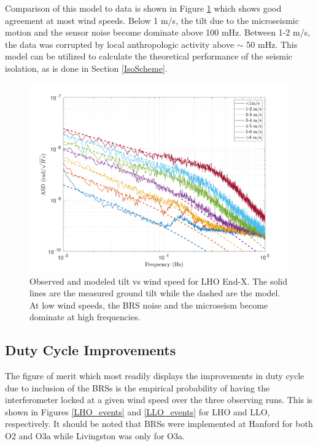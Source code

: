 \documentclass [12pt, proquest]{uwthesis}[2019]
\begin{document}
Comparison of this model to data is shown in Figure \ref{tiltModel} which shows good agreement at most wind speeds. Below 1 m/s, the tilt due to the microseismic motion and the sensor noise become dominate above 100 mHz. Between 1-2 m/s, the data was corrupted by local anthropologic activity above $\sim$ 50 mHz. This model can be utilized to calculate the theoretical performance of the seismic isolation, as is done in Section \ref{IsoScheme}.

\begin{figure}[!h]
\begin{center}
\includegraphics[width=\textwidth]{TiltModel.pdf}
\caption[Observed and modeled tilt vs wind speed]{Observed and modeled tilt vs wind speed for LHO End-X. The solid lines are the measured ground tilt while the dashed are the model. At low wind speeds, the BRS noise and the microseism become dominate at high frequencies.}
\label{tiltModel}
\end{center}
\end{figure}

\subsection{Duty Cycle Improvements}

The figure of merit which most readily displays the improvements in duty cycle due to inclusion of the BRSs is the empirical probability of having the interferometer locked at a given wind speed over the three observing runs. This is shown in Figures \ref{LHO_events} and \ref{LLO_events} for LHO and LLO, respectively. It should be noted that BRSs were implemented at Hanford for both O2 and O3a while Livingston was only for O3a.
\end{document}
